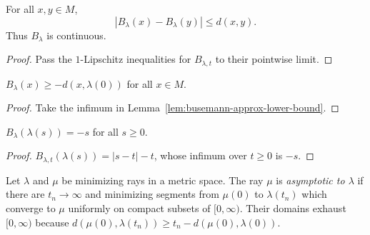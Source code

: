 \begin{lemma}
\label{lem:busemann-lipschitz}





For all $x,y\in M$,
$$|B_\lambda(x)-B_\lambda(y)|\le d(x,y).$$
Thus $B_\lambda$ is continuous.
\end{lemma}
\begin{proof}
\sketch

Pass the $1$-Lipschitz inequalities for $B_{\lambda,t}$ to their
pointwise limit.
\end{proof}

\begin{lemma}
\label{lem:busemann-lower-bound}





$B_\lambda(x)\ge-d(x,\lambda(0))$ for all $x\in M$.
\end{lemma}
\begin{proof}
\sketch

Take the infimum in Lemma~\ref{lem:busemann-approx-lower-bound}.
\end{proof}

\begin{lemma}
\label{lem:busemann-along-ray}





$B_\lambda(\lambda(s))=-s$ for all $s\ge0$.
\end{lemma}
\begin{proof}
\sketch

$B_{\lambda,t}(\lambda(s))=|s-t|-t$, whose infimum over $t\ge0$ is
$-s$.
\end{proof}

\begin{definition}
\label{def:asymptotic-ray}






Let $\lambda$ and $\mu$ be minimizing rays in a metric space. The ray
$\mu$ is \emph{asymptotic to $\lambda$} if there are $t_n\to\infty$
and minimizing segments from $\mu(0)$ to $\lambda(t_n)$ which converge
to $\mu$ uniformly on compact subsets of $[0,\infty)$. Their domains
exhaust $[0,\infty)$ because
$d(\mu(0),\lambda(t_n))\ge t_n-d(\mu(0),\lambda(0))$.
\end{definition}

